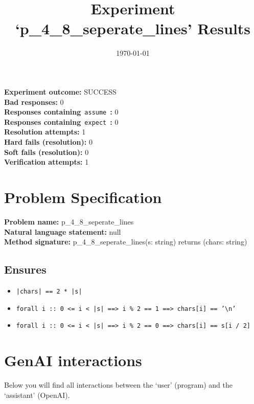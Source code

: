 \documentclass{article}
\begin{document}
\title{Experiment `p\_4\_8\_seperate\_lines' Results}
\author{\today}
\date{}
\maketitle
\textbf{Experiment outcome: }SUCCESS
\\\textbf{Bad responses: }0
\\\textbf{Responses containing}~\texttt{assume}~\textbf{: }0
\\\textbf{Responses containing}~\texttt{expect}~\textbf{: }0
\\\textbf{Resolution attempts: }1
\\\textbf{Hard fails (resolution): }0
\\\textbf{Soft fails (resolution): }0
\\\textbf{Verification attempts: }1
\section*{Problem Specification}
\textbf{Problem name: }p\_4\_8\_seperate\_lines
\\\textbf{Natural language statement: }null
\\\textbf{Method signature: }p\_4\_8\_seperate\_lines(s: string) returns (chars: string)
\subsection*{Ensures}
\begin{itemize}
\item \texttt{|chars| == 2 * |s|}
\item \texttt{forall i :: 0 <= i < |s| ==> i \% 2 == 1 ==> chars[i] == '\textbackslash{}n'}
\item \texttt{forall i :: 0 <= i < |s| ==> i \% 2 == 0 ==> chars[i] == s[i / 2]}
\end{itemize}
\clearpage
\section*{GenAI interactions}
Below you will find all interactions between the `user' (program) and the `assistant' (OpenAI).
\end{document}

